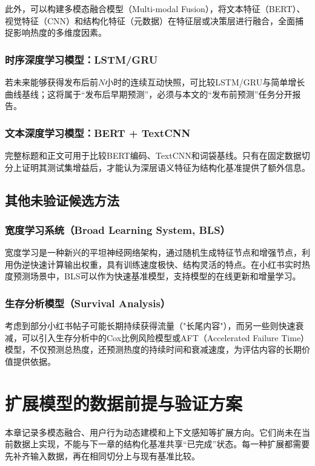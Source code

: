 此外，可以构建多模态融合模型（Multi-modal Fusion），将文本特征（BERT）、视觉特征（CNN）和结构化特征（元数据）在特征层或决策层进行融合，全面捕捉影响热度的多维度因素。

\subsection{时序深度学习模型：LSTM/GRU}
若未来能够获得发布后前$N$小时的连续互动快照，可比较LSTM/GRU与简单增长曲线基线；这将属于“发布后早期预测”，必须与本文的“发布前预测”任务分开报告。

\subsection{文本深度学习模型：BERT + TextCNN}
完整标题和正文可用于比较BERT编码、TextCNN和词袋基线。只有在固定数据切分上证明其测试集增益后，才能认为深层语义特征为结构化基准提供了额外信息。

\section{其他未验证候选方法}

\subsection{宽度学习系统（Broad Learning System, BLS）}
宽度学习是一种新兴的平坦神经网络架构，通过随机生成特征节点和增强节点，利用伪逆快速计算输出权重，具有训练速度极快、结构灵活的特点。在小红书实时热度预测场景中，BLS可以作为快速基准模型，支持模型的在线更新和增量学习。

\subsection{生存分析模型（Survival Analysis）}
考虑到部分小红书帖子可能长期持续获得流量（"长尾内容"），而另一些则快速衰减，可以引入生存分析中的Cox比例风险模型或AFT（Accelerated Failure Time）模型，不仅预测总热度，还预测热度的持续时间和衰减速度，为评估内容的长期价值提供依据。

\chapter{扩展模型的数据前提与验证方案}

本章记录多模态融合、用户行为动态建模和上下文感知等扩展方向。它们尚未在当前数据上实现，不能与下一章的结构化基准共享“已完成”状态。每一种扩展都需要先补齐输入数据，再在相同切分上与现有基准比较。

